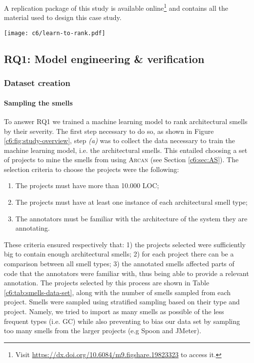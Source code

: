 A replication package of this study is available online\footnote{Visit \url{https://dx.doi.org/10.6084/m9.figshare.19823323} to access it.} and contains all the material used to design this case study.

\begin{figure*}
    \centering
    \texttt{[image: c6/learn-to-rank.pdf]}
    \caption{Detailed diagram of the model engineering and model evaluation phases.}\label{c6:fig:study-overview}
\end{figure*}

\subsection{RQ1: Model engineering \& verification}\label{c6:sec:rq1-methodology}
\subsubsection{Dataset creation}
\paragraph{Sampling the smells}
To answer RQ1 we trained a machine learning model to rank architectural smells by their severity.
The first step necessary to do so, as shown in Figure \ref{c6:fig:study-overview}, step \emph{(a)} was to collect the data necessary to train the machine learning model, i.e. the architectural smells. This entailed choosing a set of projects to mine the smells from using \textsc{Arcan} (see Section \ref{c6:sec:AS}). 
The selection criteria to choose the projects were the following:
\begin{enumerate}
    \item The projects must have more than 10.000 LOC; 
    \item The projects must have at least one instance of each architectural smell type;
    \item The annotators must be familiar with the architecture of the system they are annotating.
\end{enumerate}
These criteria ensured respectively that: 1) the projects selected were sufficiently big to contain enough architectural smells; 2) for each project there can be a comparison between all smell types; 3) the annotated smells affected parts of code that the annotators were familiar with, thus being able to provide a relevant annotation.
The projects selected by this process are shown in Table \ref{c6:tab:smells-data-set}, along with the number of smells sampled from each project.
Smells were sampled using stratified sampling based on their type and project.
Namely, we tried to import as many smells as possible of the less frequent types (i.e. GC) while also preventing to bias our data set by sampling too many smells from the larger projects (e.g Spoon and JMeter).

